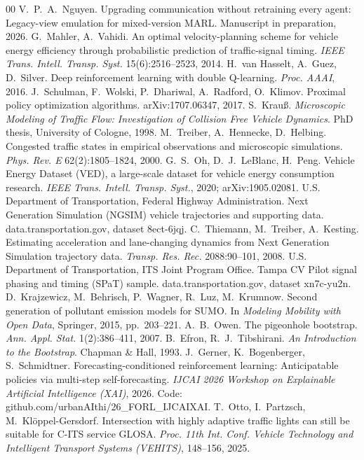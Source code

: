 \begin{thebibliography}{00}
 V.~P.~A.~Nguyen. Upgrading communication without retraining every agent: Legacy-view emulation for mixed-version MARL. Manuscript in preparation, 2026.
 G.~Mahler, A.~Vahidi. An optimal velocity-planning scheme for vehicle energy efficiency through probabilistic prediction of traffic-signal timing. \emph{IEEE Trans. Intell. Transp. Syst.} 15(6):2516--2523, 2014.
 H.~van Hasselt, A.~Guez, D.~Silver. Deep reinforcement learning with double Q-learning. \emph{Proc. AAAI}, 2016.
 J.~Schulman, F.~Wolski, P.~Dhariwal, A.~Radford, O.~Klimov. Proximal policy optimization algorithms. arXiv:1707.06347, 2017.
 S.~Krau{\ss}. \emph{Microscopic Modeling of Traffic Flow: Investigation of Collision Free Vehicle Dynamics}. PhD thesis, University of Cologne, 1998.
 M.~Treiber, A.~Hennecke, D.~Helbing. Congested traffic states in empirical observations and microscopic simulations. \emph{Phys. Rev. E} 62(2):1805--1824, 2000.
 G.~S.~Oh, D.~J.~LeBlanc, H.~Peng. Vehicle Energy Dataset (VED), a large-scale dataset for vehicle energy consumption research. \emph{IEEE Trans. Intell. Transp. Syst.}, 2020; arXiv:1905.02081.
 U.S. Department of Transportation, Federal Highway Administration. Next Generation Simulation (NGSIM) vehicle trajectories and supporting data. data.transportation.gov, dataset 8ect-6jqj.
 C.~Thiemann, M.~Treiber, A.~Kesting. Estimating acceleration and lane-changing dynamics from Next Generation Simulation trajectory data. \emph{Transp. Res. Rec.} 2088:90--101, 2008.
 U.S. Department of Transportation, ITS Joint Program Office. Tampa CV Pilot signal phasing and timing (SPaT) sample. data.transportation.gov, dataset xn7c-yu2n.
 D.~Krajzewicz, M.~Behrisch, P.~Wagner, R.~Luz, M.~Krumnow. Second generation of pollutant emission models for SUMO. In \emph{Modeling Mobility with Open Data}, Springer, 2015, pp.~203--221.
 A.~B.~Owen. The pigeonhole bootstrap. \emph{Ann. Appl. Stat.} 1(2):386--411, 2007.
 B.~Efron, R.~J.~Tibshirani. \emph{An Introduction to the Bootstrap}. Chapman \& Hall, 1993.
 J.~Gerner, K.~Bogenberger, S.~Schmidtner. Forecasting-conditioned reinforcement learning: Anticipatable policies via multi-step self-forecasting. \emph{IJCAI 2026 Workshop on Explainable Artificial Intelligence (XAI)}, 2026. Code: github.com/urbanAIthi/26\_FORL\_IJCAIXAI.
 T.~Otto, I.~Partzsch, M.~Kl\"oppel-Gersdorf. Intersection with highly adaptive traffic lights can still be suitable for C-ITS service GLOSA. \emph{Proc. 11th Int. Conf. Vehicle Technology and Intelligent Transport Systems (VEHITS)}, 148--156, 2025.

\end{thebibliography}
